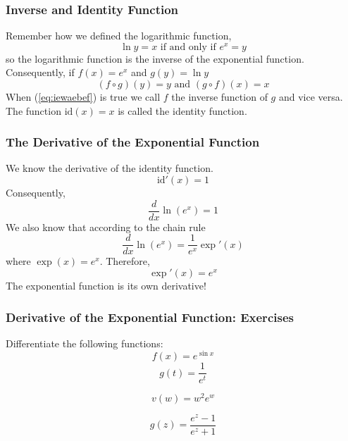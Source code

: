 \documentclass[xcolor=dvipsnames,handout]{beamer}
\begin{document}
\begin{frame}
  \frametitle{Inverse and Identity Function}
Remember how we defined the logarithmic function,
\begin{equation}
  \label{eq:tieteiph}
  \ln{}y=x\mbox{ if and only if }e^{x}=y
\end{equation}
so the logarithmic function is the inverse of the exponential
function. Consequently, if $f(x)=e^{x}$ and $g(y)=\ln{}y$
\begin{equation}
  \label{eq:iewaebef}
  (f\circ{}g)(y)=y\mbox{ and }(g\circ{}f)(x)=x
\end{equation}
When (\ref{eq:iewaebef}) is true we call $f$ the \alert{inverse
  function} of $g$ and vice versa. The function $\mbox{id}(x)=x$ is called
the \alert{identity function}. 
\end{frame}

\begin{frame}
  \frametitle{The Derivative of the Exponential Function}
We know the derivative of the identity function.
\begin{equation}
  \label{eq:sivahzuw}
  \mbox{id}'(x)=1
\end{equation}
Consequently,
\begin{equation}
  \label{eq:zeejaixu}
  \frac{d}{dx}\ln\left(e^{x}\right)=1
\end{equation}
We also know that according to the chain rule
\begin{equation}
  \label{eq:iecheixo}
  \frac{d}{dx}\ln\left(e^{x}\right)=\frac{1}{e^{x}}\exp'(x)
\end{equation}
where $\exp(x)=e^{x}$. Therefore,
\begin{equation}
  \label{eq:zigaewai}
  \exp'(x)=e^{x}
\end{equation}
The exponential function is its own derivative!
\end{frame}

\begin{frame}
  \frametitle{Derivative of the Exponential Function: Exercises}
Differentiate the following functions:
\begin{equation}
  \label{eq:beetulae}
f(x)=e^{\sin{}x}  
\end{equation}
\begin{equation}
  \label{eq:aekephii}
g(t)=\frac{1}{e^{t}}  
\end{equation}

\bigskip

\begin{equation}
  \label{eq:uijeabai}
v(w)=w^{2}e^{w}  
\end{equation}

\bigskip

\begin{equation}
  \label{eq:ohzabeed}
g(z)=\frac{e^{z}-1}{e^{z}+1}  
\end{equation}
\end{frame}
\end{document}
